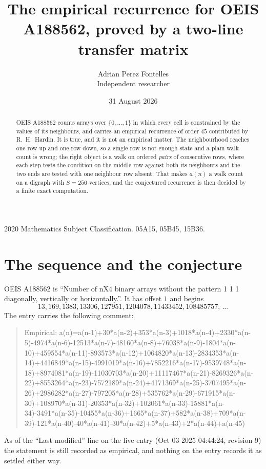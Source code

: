\documentclass[11pt,a4paper]{article}
\title{The empirical recurrence for OEIS A188562, proved by a two-line transfer matrix}
\author{Adrian Perez Fontelles\\ \small Independent researcher}
\date{31 August 2026}
\theoremstyle{plain}
\theoremstyle{definition}
\begin{document}
\maketitle

\begin{abstract}
OEIS A188562 counts arrays over $\{0,\dots,1\}$ in which every cell is constrained by the
values of its neighbours, and carries an empirical recurrence of order $45$ contributed
by R.~H.~Hardin. It is true, and it is not an empirical matter. The neighbourhood reaches one
row up and one row down, so a single row is not enough state and a plain walk count
is wrong; the right object is a walk on ordered \emph{pairs} of consecutive rows, where
each step tests the condition on the middle row against both its neighbours and the two
ends are tested with one neighbour row absent. That makes $a(n)$ a walk count on a digraph
with $S=256$ vertices, and the conjectured recurrence is then decided by a finite exact
computation.
\end{abstract}

\noindent\small 2020 Mathematics Subject Classification. 05A15, 05B45, 15B36.\normalsize

\section{The sequence and the conjecture}

OEIS A188562 is ``Number of nX4 binary arrays without the pattern 1 1 1 diagonally, vertically or horizontally.''. It has offset $1$ and begins
\[
13, 169, 1383, 13306, 127951, 1204078, 11433452, 108485757,\ \dots
\]
The entry carries the following comment:
\begin{quote}\small
Empirical: a(n)=a(n-1)+30*a(n-2)+353*a(n-3)+1018*a(n-4)+2330*a(n-5)-4974*a(n-6)-12513*a(n-7)-48160*a(n-8)+76038*a(n-9)-1804*a(n-10)+459554*a(n-11)-893573*a(n-12)+1064820*a(n-13)-2834353*a(n-14)+4416849*a(n-15)-4991019*a(n-16)+7852216*a(n-17)-9539748*a(n-18)+8974081*a(n-19)-11030703*a(n-20)+11117467*a(n-21)-8269326*a(n-22)+8553264*a(n-23)-7572189*a(n-24)+4171369*a(n-25)-3707495*a(n-26)+2986282*a(n-27)-797205*a(n-28)+535762*a(n-29)-671915*a(n-30)+108970*a(n-31)-20353*a(n-32)+102061*a(n-33)-15881*a(n-34)-3491*a(n-35)-10455*a(n-36)+1665*a(n-37)+582*a(n-38)+709*a(n-39)-121*a(n-40)-40*a(n-41)-30*a(n-42)+5*a(n-43)+2*a(n-44)+a(n-45)
\end{quote}
As of the ``Last modified'' line on the live entry (Oct 03 2025 04:44:24, revision 9) the statement is
still recorded as empirical, and nothing on the entry records it as settled either way.
\end{document}
